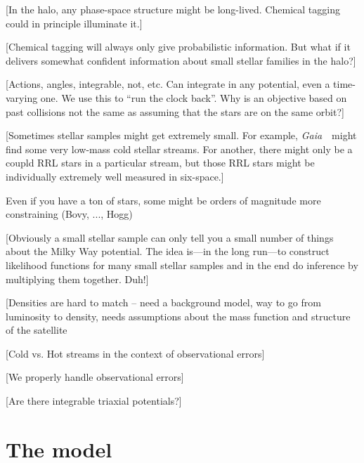 \documentclass[letterpaper,12pt,preprint]{aastex}
\newcommand{\project}[1]{\textsl{#1}}
\newcommand{\gaia}{\project{Gaia}~}
\begin{document}
[In the halo, any phase-space structure might be long-lived.  Chemical
  tagging could in principle illuminate it.]

[Chemical tagging will always only give probabilistic information.
  But what if it delivers somewhat confident information about small
  stellar families in the halo?]

[Actions, angles, integrable, not, etc.  Can integrate in any
  potential, even a time-varying one. We use this to
  ``run the clock back''.  Why is an objective based on past collisions not the
  same as assuming that the stars are on the same orbit?]

[Sometimes stellar samples might get extremely small.  For example,
  \gaia\ might find some very low-mass cold stellar streams.  For
  another, there might only be a coupld RRL stars in a particular
  stream, but those RRL stars might be individually extremely well
  measured in six-space.]

Even if you have a ton of stars, some might be orders of magnitude more constraining (Bovy, ..., Hogg)

[Obviously a small stellar sample can only tell you a small number of
  things about the Milky Way potential.  The idea is---in the long
  run---to construct likelihood functions for many small stellar
  samples and in the end do inference by multiplying them together.
  Duh!]

[Densities are hard to match -- need a background model, way to go from luminosity to density, needs assumptions about the mass function and structure of the satellite\

[Cold vs. Hot streams in the context of observational errors]

[We properly handle observational errors]

[Are there integrable triaxial potentials?]

\section{The model}
\end{document}
